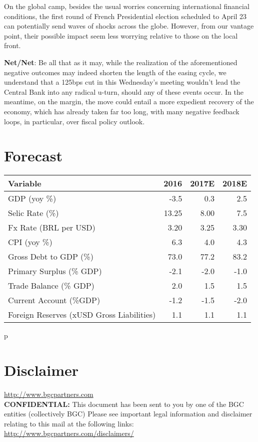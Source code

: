 \documentclass{report}
\begin{document}
\begin{compactitem}[$\diamond$]
On the global camp, besides the usual worries concerning
international financial conditions, the first round of French
Presidential election scheduled to April 23 can potentially send
waves of shocks across the globe. However, from our vantage point,
their possible impact seem less worrying relative to those on the
local front.

\item \textbf{Net/Net}: Be all that as it may, while the realization of the
aforementioned negative outcomes may indeed shorten the length of
the easing cycle, we understand that a 125bps cut in this
Wednesday's meeting wouldn't lead the Central Bank into any radical
u-turn, should any of these events occur. In the meantime, on the
margin, the move could entail a more expedient recovery of the
economy, which has already taken far too long, with many negative
feedback loops, in particular, over fiscal policy outlook.
\end{compactitem}


\newpage

\section{Forecast}
\label{sec:org4ff6bb4}

\begin{center}
\begin{tabular}{lrrr}
\textbf{Variable} & \textbf{2016} & \textbf{2017E} & \textbf{2018E}\\
\hline
\hline
GDP (yoy \%) & -3.5 & 0.3 & 2.5\\
Selic Rate (\%) & 13.25 & 8.00 & 7.5\\
Fx Rate (BRL per USD) & 3.20 & 3.25 & 3.30\\
CPI (yoy \%) & 6.3 & 4.0 & 4.3\\
Gross Debt to GDP (\%) & 73.0 & 77.2 & 83.2\\
Primary Surplus (\% GDP) & -2.1 & -2.0 & -1.0\\
Trade Balance (\% GDP) & 2.0 & 1.5 & 1.5\\
Current Account (\%GDP) & -1.2 & -1.5 & -2.0\\
Foreign Reserves (xUSD Gross Liabilities) & 1.1 & 1.1 & 1.1\\
\hline
\end{tabular}
\end{center}
\newpage

p
\section{Disclaimer}
\label{sec:orgce20997}
\url{http://www.bgcpartners.com} \\
\textbf{CONFIDENTIAL:} This document has been sent to you by one of
the BGC entities (collectively BGC) Please see important legal
information and disclaimer relating to this mail at the following
links: \url{http://www.bgcpartners.com/disclaimers/}
\end{document}
